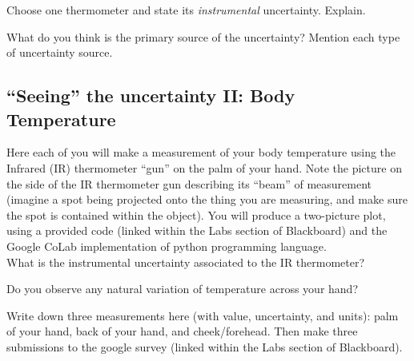 \answerspace[2cm]

\noindent Choose one thermometer and state its {\em instrumental} uncertainty.  Explain.

\answerspace[2cm]

\noindent What do you think is the primary source of the uncertainty?  Mention each type of uncertainty source.

\answerspace[2cm]


\subsection{``Seeing'' the uncertainty II: Body Temperature}

Here each of you will make a measurement of your body temperature using the Infrared (IR) thermometer ``gun'' on the palm of your hand.  Note the picture on the side of the IR thermometer gun describing its ``beam'' of measurement (imagine a spot being projected onto the thing you are measuring, and make sure the spot is contained within the object).  You will produce a two-picture plot, using a provided code (linked within the Labs section of Blackboard) and the Google CoLab implementation of python programming language.\\


\noindent What is the instrumental uncertainty associated to the IR thermometer?


\answerspace[2cm]

\noindent Do you observe any natural variation of temperature across your hand?

\answerspace[2cm]

\noindent Write down three measurements here (with value, uncertainty, and units): palm of your hand, back of your hand, and cheek/forehead. Then make three submissions to the google survey (linked within the Labs section of Blackboard).


\answerspace[2cm]

